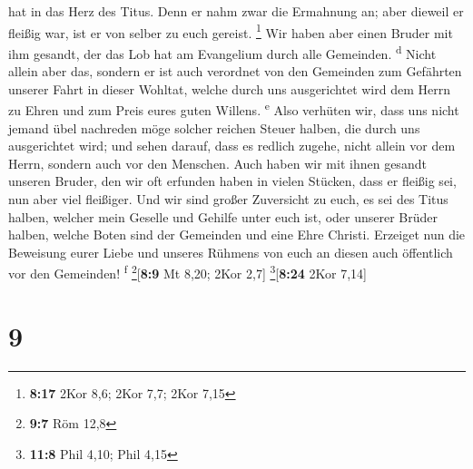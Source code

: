hat in das Herz des Titus.  Denn er nahm zwar die
Ermahnung an; aber dieweil er fleißig war, ist er von selber zu euch
gereist. \footnote{\textbf{8:17} 2Kor 8,6; 2Kor 7,7; 2Kor 7,15}
 Wir haben aber einen Bruder mit ihm gesandt, der das Lob
hat am Evangelium durch alle Gemeinden. \textsuperscript{d}
 Nicht allein aber das, sondern er ist auch verordnet von
den Gemeinden zum Gefährten unserer Fahrt in dieser Wohltat, welche
durch uns ausgerichtet wird dem Herrn zu Ehren und zum Preis eures guten
Willens. \textsuperscript{e}  Also verhüten wir, dass uns
nicht jemand übel nachreden möge solcher reichen Steuer halben, die
durch uns ausgerichtet wird;  und sehen darauf, dass es
redlich zugehe, nicht allein vor dem Herrn, sondern auch vor den
Menschen.  Auch haben wir mit ihnen gesandt unseren
Bruder, den wir oft erfunden haben in vielen Stücken, dass er fleißig
sei, nun aber viel fleißiger.  Und wir sind großer
Zuversicht zu euch, es sei des Titus halben, welcher mein Geselle und
Gehilfe unter euch ist, oder unserer Brüder halben, welche Boten sind
der Gemeinden und eine Ehre Christi.  Erzeiget nun die
Beweisung eurer Liebe und unseres Rühmens von euch an diesen auch
öffentlich vor den Gemeinden! \textsuperscript{f}
\footnote{\textbf{9:7} Röm 12,8}{[}\textbf{8:9} Mt 8,20; 2Kor 2,7{]}
\footnote{\textbf{11:8} Phil 4,10; Phil 4,15}{[}\textbf{8:24} 2Kor
7,14{]}

\hypertarget{section-8}{%
\section{9}\label{section-8}}

